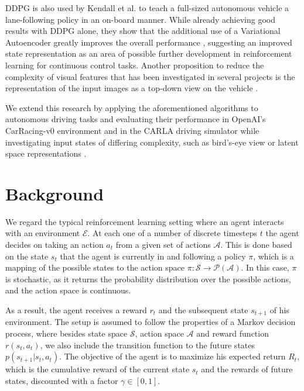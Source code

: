 \documentclass[letterpaper, 10 pt, conference]{ieeeconf}  %
\begin{document}
DDPG is also used by Kendall et al. to teach a full-sized autonomous vehicle a lane-following policy in an on-board manner. While already achieving good results with DDPG alone, they show that the additional use of a Variational Autoencoder greatly improves the overall performance \cite{kendall2019learning}, suggesting an improved state representation as an area of possible further development in reinforcement learning for continuous control tasks. Another proposition to reduce the complexity of visual features that has been investigated in several projects is the representation of the input images as a top-down view on the vehicle \cite{DBLP:journals/corr/abs-1812-03079}\cite{DBLP:journals/corr/abs-1903-00640}\cite{Djuric2018ShorttermMP}.

We extend this research by applying the aforementioned algorithms to autonomous driving tasks and evaluating their performance in OpenAI's CarRacing-v0 environment and in the CARLA driving simulator while investigating input states of differing complexity, such as bird's-eye view or latent space representations \cite{dosovitskiy2017carla}.


\section{Background}

We regard the typical reinforcement learning setting where an agent interacts with an environment $\mathcal{E}$. At each one of a number of discrete timesteps $t$ the agent decides on taking an action $a_t$ from a given set of actions $\mathcal{A}$. This is done based on the state $s_t$ that the agent is currently in and following a policy $\pi$, which is a mapping of the possible states to the action space $\pi: \mathcal{S} \rightarrow \mathcal{P}(\mathcal{A})$. In this case, $\pi$ is stochastic, as it returns the probability distribution over the possible actions, and the action space is continuous.

As a result, the agent receives a reward $r_t$ and the subsequent state $s_{t+1}$ of his environment. The setup is assumed to follow the properties of a Markov decision process, where besides state space $\mathcal{S}$, action space $\mathcal{A}$ and reward function $r(s_t,a_t)$, we also include the transition function to the future states $p(s_{t+1}|s_t,a_t)$. The objective of the agent is to maximize his expected return $R_t$, which is the cumulative reward of the current state $s_t$ and the rewards of future states, discounted with a factor $\gamma \in [0,1]$.
\end{document}
